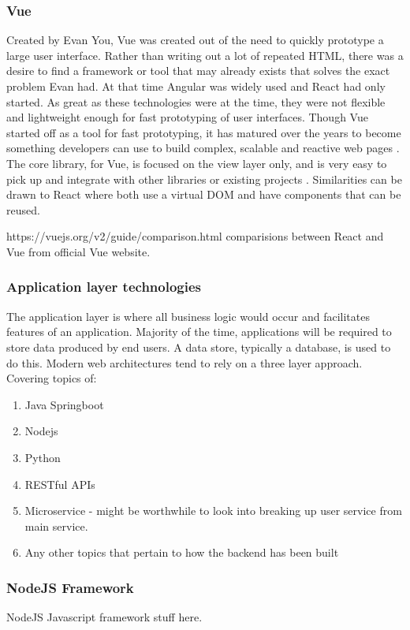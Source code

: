 \subsubsection*{Vue}
Created by Evan You, Vue was created out of the need to quickly prototype a large user interface.
Rather than writing out a lot of repeated HTML, there was a desire to find a framework or tool that may already exists that solves the exact problem Evan had.
At that time Angular was widely used and React had only started. As great as these technologies were at the time, they were not flexible and lightweight
enough for fast prototyping of user interfaces. Though Vue started off as a tool for fast prototyping, it has matured over the
years to become something developers can use to build complex, scalable and reactive web pages \cite{filipova2016learning}.
The core library, for Vue, is focused on the view layer only, and is very easy to pick up and integrate with other libraries or existing projects \cite{koetsier2016evaluation}.
Similarities can be drawn to React where both use a virtual DOM and have components that can be reused.

https://vuejs.org/v2/guide/comparison.html comparisions between React and Vue from official Vue website.


\subsubsection{Application layer technologies}
The application layer is where all business logic would occur and facilitates features of an application.
Majority of the time, applications will be required to store data produced by end users. A data store, typically a database, is
used to do this.
Modern web architectures tend to rely on a three layer approach. 
Covering topics of:
\begin{enumerate}
    \item Java Springboot
    \item Nodejs
    \item Python
    \item RESTful APIs
    \item Microservice - might be worthwhile to look into breaking up user service from main service.
    \item Any other topics that pertain to how the backend has been built
\end{enumerate}

\subsubsection*{NodeJS Framework}
NodeJS Javascript framework stuff here.

